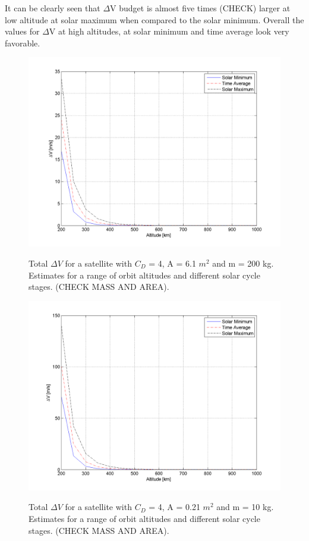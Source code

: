 It can be clearly seen that $\Delta$V budget is almost five times (CHECK) larger at low altitude at solar maximum when compared to the solar minimum. Overall the values for $\Delta$V at high altitudes, at solar minimum and time average look very favorable. 

\begin{figure}[h!]
\centering
\includegraphics[width=0.95\textheight, angle=90]{chapters/img/deltaVEmitter.png}
\label{fig:deltaVGraph1}
\caption{Total $\Delta V$ for a satellite with $C_D$ = 4, A = 6.1 $m^2$ and m = 200 kg. Estimates for a range of orbit altitudes and different solar cycle stages. (CHECK MASS AND AREA).}
\end{figure}

\begin{figure}[h!]
\centering
\includegraphics[width=0.95\textheight, angle=90]{chapters/img/deltaVReceiver.png}
\label{fig:deltaVGraph2}
\caption{Total $\Delta V$ for a satellite with $C_D$ = 4, A = 0.21 $m^2$ and m = 10 kg. Estimates for a range of orbit altitudes and different solar cycle stages. (CHECK MASS AND AREA).}
\end{figure}   

